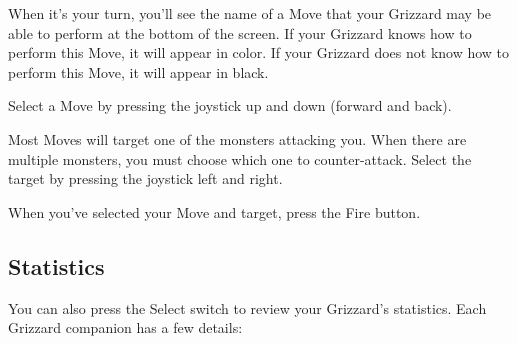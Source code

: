 \documentclass[12pt,twoside,openright,book]{memoir}
\begin{document}
When it's your turn, you'll see the name of a Move that your Grizzard may be
able to perform at the bottom of the screen. If your Grizzard knows how to
perform this Move, it will appear in color. If your Grizzard does not know
how to perform this Move, it will appear in black.

Select a Move by pressing the joystick up and down (forward and back).

Most Moves will target one of the monsters attacking you. When there are
multiple monsters, you must choose which one to counter-attack. Select the
target by pressing the joystick left and right.

When you've selected your Move and target, press the Fire button.

\subsection{Statistics}

You can also press the Select switch to review your Grizzard's statistics.
Each Grizzard companion has a few details:
\end{document}
